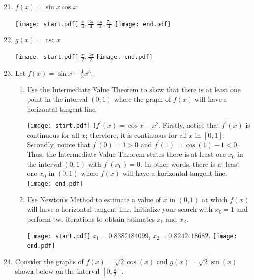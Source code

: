 \documentclass[12pt]{article}
\begin{document}
\begin{enumerate}
\setcounter{enumi}{20}

\item $f(x) = \sin{x}\cos{x}$ 

\texttt{[image: start.pdf]}
{{$\frac{\pi}{4}, \frac{3\pi}{4}, \frac{5\pi}{4}, \frac{7\pi}{4}$}}
\texttt{[image: end.pdf]}


\item $g(x) = \csc{x}$ 

\texttt{[image: start.pdf]}
{{$\frac{\pi}{2}, \frac{3\pi}{2}$}}
\texttt{[image: end.pdf]}


\item Let $f(x)=\sin{x}-\frac{1}{3}x^3$.

\begin{enumerate}

\item Use the Intermediate Value Theorem to show that there is at least one point in the interval $(0,1)$ where the graph of $f(x)$ will have a horizontal tangent line.

\texttt{[image: start.pdf]}
{{{1\linewidth}{$f^{\prime}(x)=\cos{x}-x^2$.  Firstly, notice that $f^{\prime}(x)$ is continuous for all $x$; therefore, it is continuous for all $x$ in $[0,1]$.  Secondly, notice that $f^{\prime}(0)=1>0$ and $f^{\prime}(1)=\cos{(1)}-1<0$.  Thus, the Intermediate Value Theorem states there is at least one $x_0$ in the interval $(0,1)$ with $f^{\prime}(x_0)=0$.  In other words, there is at least one $x_0$ in $(0,1)$ where $f(x)$ will have a horizontal tangent line.}}}
\texttt{[image: end.pdf]}


\item Use Newton's Method to estimate a value of $x$ in $(0,1)$ at which $f(x)$ will have a horizontal tangent line.  Initialize your search with $x_0=1$ and perform two iterations to obtain estimates $x_1$ and $x_2$.

\texttt{[image: start.pdf]}
{{$x_1 = 0.8382184099$, $x_2= 0.8242418682$.}}
\texttt{[image: end.pdf]}


\end{enumerate}

\item Consider the graphs of $f(x)=\sqrt{2}\cos(x)$ and $g(x)=\sqrt{2}\sin(x)$ shown below on the interval $\left[0,\frac{\pi}{2}\right]$.


\end{enumerate}
\end{document}
